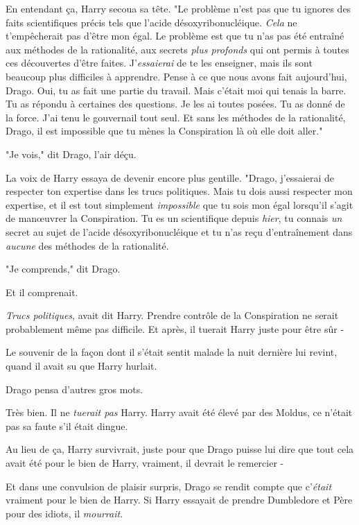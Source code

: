 En entendant ça, Harry secoua sa tête. "Le problème n'est pas que tu ignores des faits scientifiques précis tels que l'acide désoxyribonucléique. \emph{Cela} ne t'empêcherait pas d'être mon égal. Le problème est que tu n'as pas été entraîné aux méthodes de la rationalité, aux secrets \emph{plus profonds} qui ont permis à toutes ces découvertes d'être faites. J'\emph{essaierai} de te les enseigner, mais ils sont beaucoup plus difficiles à apprendre. Pense à ce que nous avons fait aujourd'hui, Drago. Oui, tu as fait une partie du travail. Mais c'était moi qui tenais la barre. Tu as répondu à certaines des questions. Je les ai toutes posées. Tu as donné de la force. J'ai tenu le gouvernail tout seul. Et sans les méthodes de la rationalité, Drago, il est impossible que tu mènes la Conspiration là où elle doit aller."

"Je vois," dit Drago, l'air déçu.

La voix de Harry essaya de devenir encore plus gentille. "Drago, j'essaierai de respecter ton expertise dans les trucs politiques. Mais tu dois aussi respecter mon expertise, et il est tout simplement \emph{impossible} que tu sois mon égal lorsqu'il s'agit de manœuvrer la Conspiration. Tu es un scientifique depuis \emph{hier}, tu connais \emph{un} secret au sujet de l'acide désoxyribonucléique et tu n'as reçu d'entraînement dans \emph{aucune} des méthodes de la rationalité.

"Je comprends," dit Drago.

Et il comprenait.

\emph{Trucs politiques}, avait dit Harry. Prendre contrôle de la Conspiration ne serait probablement même pas difficile. Et après, il tuerait Harry juste pour être sûr -

Le souvenir de la façon dont il s'était sentit malade la nuit dernière lui revint, quand il avait su que Harry hurlait.

Drago pensa d'autres gros mots.

Très bien. Il ne \emph{tuerait pas} Harry. Harry avait été élevé par des Moldus, ce n'était pas sa faute s'il était dingue.

Au lieu de ça, Harry survivrait, juste pour que Drago puisse lui dire que tout cela avait été pour le bien de Harry, vraiment, il devrait le remercier -

Et dans une convulsion de plaisir surpris, Drago se rendit compte que c'\emph{était} vraiment pour le bien de Harry. Si Harry essayait de prendre Dumbledore et Père pour des idiots, il \emph{mourrait}.

